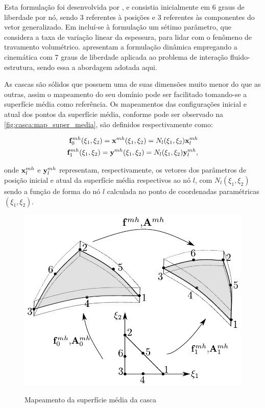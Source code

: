 Esta formulação foi desenvolvida por , e consistia inicialmente em 6 graus de liberdade por nó, sendo 3 referentes à posições e 3 referentes às componentes do vetor generalizado. Em  incluí-se à formulação um sétimo parâmetro, que considera a taxa de variação linear da espessura, para lidar com o fenômeno de travamento volumétrico.  apresentam a formulação dinâmica empregando a cinemática com 7 graus de liberdade  aplicada ao problema de interação fluido-estrutura, sendo essa a abordagem adotada aqui.

As cascas são sólidos que possuem uma de suas dimensões muito menor do que as outras, assim o mapeamento do seu domínio pode ser facilitado tomando-se a superfície média como referência. Os mapeamentos das configurações inicial e atual dos pontos da superfície média, conforme pode ser observado na \autoref{fig:casca:map_super_media}, são definidos respectivamente como:

\begin{align}
	\mathbf{f}^{mh}_{0}(\xi_{1},\xi_{2}) = \mathbf{x}^{mh}(\xi_{1},\xi_{2}) = N_{l} (\xi_{1},\xi_{2}) \mathbf{x}_{l}^{mh}\label{eq:casca_Lposition_m}\\
	\mathbf{f}^{mh}_{1}(\xi_{1},\xi_{2}) = \mathbf{y}^{mh}(\xi_{1},\xi_{2}) = N_{l} (\xi_{1},\xi_{2}) \mathbf{y}_{l}^{mh}, \label{eq:casca_Eposition_m}
\end{align}

\noindent onde $\mathbf{x}_{l}^{mh}$ e $\mathbf{y}_{l}^{mh}$ representam, respectivamente, os vetores dos parâmetros de posição inicial e atual da superfície média respectivos ao nó $l$, com $N_{l} (\xi_{1},\xi_{2})$ sendo a função de forma do nó $l$ calculada no ponto de coordenadas paramétricas $(\xi_{1},\xi_{2})$.

\begin{figure}[!htbp]
	\caption{Mapeamento da superfície média da casca}
	\centering
	\includegraphics[scale=0.8,trim=0cm 0.0cm 0cm 0cm, clip=true]{Imagens/Cap4/casca_super_media.pdf}	
	\label{fig:casca:map_super_media}
\end{figure}

